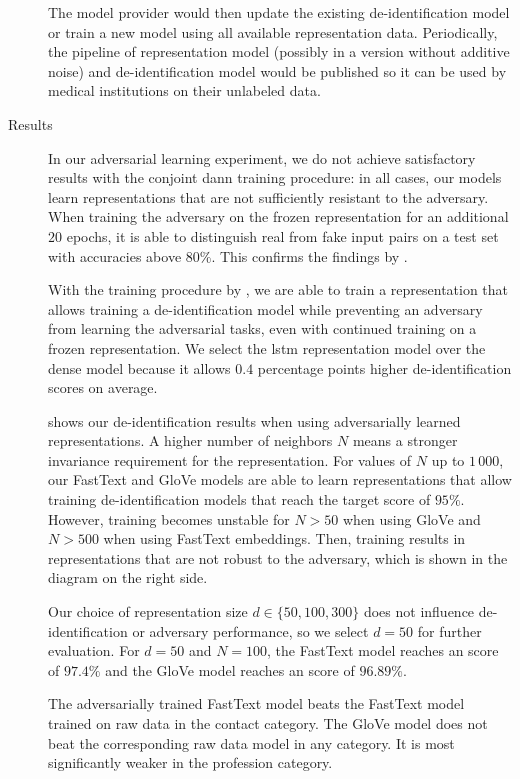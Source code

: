 \begin{description}
    The model provider would then update the existing de-identification model or train a new model using all available representation data.
    Periodically, the pipeline of representation model (possibly in a version without additive noise) and de-identification model would be published so it can be used by medical institutions on their unlabeled data.

    \item[Results]
    In our adversarial learning experiment, we do not achieve satisfactory results with the conjoint \ac{dann} training procedure: in all cases, our models learn representations that are not sufficiently resistant to the adversary.
    When training the adversary on the frozen representation for an additional $20$ epochs, it is able to distinguish real from fake input pairs on a test set with accuracies above $80\%$.
    This confirms the findings by \citet{elazar2018adversarial}.
    
    With the training procedure by \citet{feutry2018learning}, we are able to train a representation that allows training a de-identification model while preventing an adversary from learning the adversarial tasks, even with continued training on a frozen representation.
    We select the \ac{lstm} representation model over the dense model because it allows $0.4$ percentage points higher de-identification \fone scores on average.
    
     shows our de-identification results when using adversarially learned representations.
    A higher number of neighbors $N$ means a stronger invariance requirement for the representation.
    For values of $N$ up to $1\,000$, our FastText and GloVe models are able to learn representations that allow training de-identification models that reach the target \fone score of $95\%$.
    However, training becomes unstable for $N>50$ when using GloVe and $N>500$ when using FastText embeddings.
    Then, training results in representations that are not robust to the adversary, which is shown in the diagram on the right side.
    
    Our choice of representation size $d \in \{50, 100, 300\}$ does not influence de-identifi\-ca\-tion or adversary performance, so we select $d=50$ for further evaluation.
    For $d=50$ and $N=100$, the FastText model reaches an \fone score of $97.4\%$ and the GloVe model reaches an \fone score of $96.89\%$.
    
    The adversarially trained FastText model beats the FastText model trained on raw data in the contact category. 
    The GloVe model does not beat the corresponding raw data model in any category.
    It is most significantly weaker in the profession category.
\end{description}

